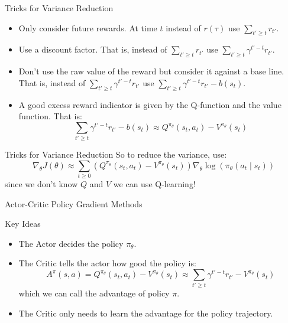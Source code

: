 \documentclass{beamer}
\begin{document}
	\begin{frame}
		\begin{block}{Tricks for Variance Reduction}
			\begin{itemize}
				\item Only consider future rewards. At time $ t$ instead of $ r(\tau) $ use $ \sum_{t'\geq t} r_{t'} $.
				\item Use a discount factor. That is, instead of $ \sum_{t'\geq t} r_{t'} $ use $ \sum_{t'\geq t} \gamma^{t'-t} r_{t'} $.
				\item Don't use the raw value of the reward but consider it against a base line. That is, instead of $ \sum_{t'\geq t} \gamma^{t'-t} r_{t'} $ use $ \sum_{t'\geq t} \gamma^{t'-t} r_{t'} -b(s_t) $.
				\item A good excess reward indicator is given by the Q-function and the value function. That is:
				$$ \sum_{t'\geq t} \gamma^{t'-t} r_{t'} -b(s_t) \approx Q^{\pi_\theta}(s_t,a_t) - V^{\pi_\theta} (s_t) $$
			\end{itemize}
		\end{block}
	\end{frame}
	
	\begin{frame}
		\begin{block}{Tricks for Variance Reduction}
			So to reduce the variance, use:
			$$ \nabla_\theta J(\theta) \approx \sum_{t\geq0} \left( Q^{\pi_\theta}(s_t,a_t) - V^{\pi_\theta} (s_t) \right) \nabla_\theta \log \left( \pi_\theta (a_t \mid s_t) \right) $$
			since we don't know $ Q $ and $ V $ we can use Q-learning!
		\end{block}
	\end{frame}
	
	\begin{frame}{Actor-Critic Policy Gradient Methods }
		\begin{block}{Key Ideas}
			\begin{itemize}
				\item The Actor decides the policy $ \pi_\theta $.
				\item The Critic tells the actor how good the policy is: 
				$$ A^\pi (s,a) = Q^{\pi_\theta}(s_t,a_t) - V^{\pi_\theta} (s_t) \approx \sum_{t'\geq t} \gamma^{t'-t} r_{t'} - V^{\pi_\theta} (s_t) $$
				which we can call the advantage of policy $ \pi $.
				\item The Critic only needs to learn the advantage for the policy trajectory.
			\end{itemize}
		\end{block}
	\end{frame}
	
\end{document}
